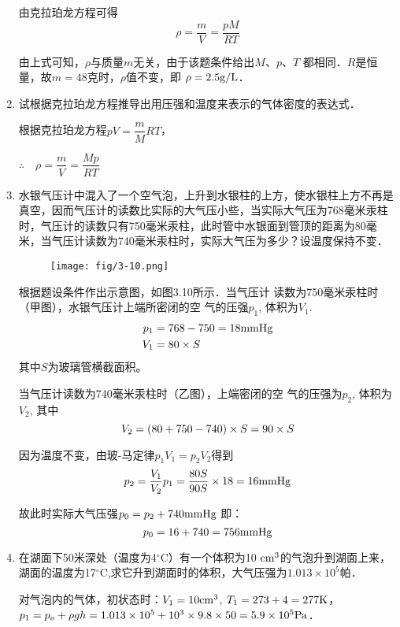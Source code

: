 \begin{enumerate}
\begin{solution}
由克拉珀龙方程可得
\[\rho=\dfrac{m}{V}=\dfrac{pM}{RT}\]

由上式可知，$\rho$与质量$m$无关，由于该题条件给出$M$、$p$、$T$
都相同．$R$是恒量，故$m=48$克时，$\rho$值不变，即
$\rho=2.5{\rm g/L}$．
\end{solution}
\item   试根据克拉珀龙方程推导出用压强和温度来表示的气体密度的表达式．

\begin{solution}
    根据克拉珀龙方程$pV=\dfrac{m}{M}RT$，

    $\therefore\quad \rho=\dfrac{m}{V}=\dfrac{Mp}{RT}$
\end{solution}
\item  水银气压计中混入了一个空气泡，上升到水银柱的上方，使水银柱上方不再是真空，因而气压计的读数比实际的大气压小些，当实际大气压为768毫米汞柱时，气压计的读数只有750毫米汞柱，此时管中水银面到管顶的距离为80毫米，当气压计读数为740毫米汞柱时，实际大气压为多少？设温度保持不变．

\begin{figure}[htp]
    \centering
\texttt{[image: fig/3-10.png]}
    \caption{}
\end{figure}

\begin{solution}
    根据题设条件作出示意图，如图3.10所示．当气压计
读数为750毫米汞柱时（甲图），水银气压计上端所密闭的空
气的压强$p_1$, 体积为$V_1$.
\[\begin{split}
    p_1&=768-750=18{\rm mmHg}\\
    V_1&=80\times S
\end{split}\]
其中$S$为玻璃管横截面积。

当气压计读数为740毫米汞柱时（乙图），上端密闭的空
气的压强为$p_2$, 体积为$V_2$, 其中
\[V_2=(80+750-740)\times S=90\times S\]

因为温度不变，由玻-马定律$p_1V_1=p_2V_2$得到
\[p_2=\frac{V_1}{V_2}p_1=\frac{80S}{90S}\times 18=16{\rm mmHg}\]

故此时实际大气压强$p_0=p_2+740{\rm mmHg}$
即：
\[p_0=16+740=756{\rm mmHg}\]

\end{solution}
\item  在湖面下50米深处（温度为4$^\circ$C）有一个体积为10
${\rm cm^3}$的气泡升到湖面上来，湖面的温度为17$^\circ$C,求它升到湖面时的体积，大气压强为$1.013\times 10^5$帕．

\begin{solution}
    对气泡内的气体，初状态时：$V_1=10{\rm cm^3}$, $T_1=273
+4=277{\rm K}$，$p_1=p_o+\rho gh=1.013\times10^5+10^3\times9.8\times50=
5.9\times10^5{\rm Pa}$．


\end{solution}
\end{enumerate}

